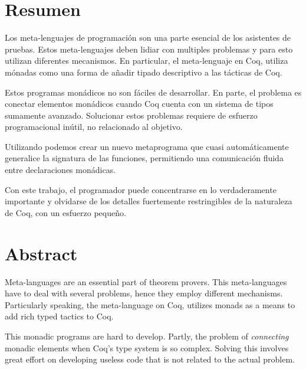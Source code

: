 \begingroup
\let\clearpage\relax
\let\cleardoublepage\relax
\let\cleardoublepage\relax



\chapter*{Resumen}

Los meta-lenguajes de programación son una parte esencial de los asistentes de pruebas. Estos meta-lenguajes deben lidiar con multiples problemas y para esto utilizan diferentes mecanismos. En particular, el meta-lenguaje \Mtac en Coq, utiliza mónadas como una forma de añadir tipado descriptivo a las tácticas de Coq.

Estos programas monádicos no son fáciles de desarrollar. En parte, el problema es conectar elementos monádicos cuando Coq cuenta con un sistema de tipos sumamente avanzado. Solucionar estos problemas requiere de esfuerzo programacional inútil, no relacionado al objetivo.

Utilizando \mtac podemos crear un nuevo metaprograma que cuasi automáticamente generalice la signatura de las funciones, permitiendo una comunicación fluida entre declaraciones monádicas. %

Con este trabajo, el programador puede concentrarse en lo verdaderamente importante y olvidarse de los detalles fuertemente restringibles de la naturaleza de Coq, con un esfuerzo pequeño.

\chapter*{Abstract}

Meta-languages are an essential part of theorem provers. This meta-languages have to deal with several problems, hence they employ different mechanisms.
Particularly speaking, the meta-language \Mtac on Coq, utilizes monads as a means to add rich typed tactics to Coq.

This monadic programs are hard to develop. Partly, the problem of \textit{connecting} monadic elements when Coq's type system is so complex. Solving this involves great effort on developing useless code that is not related to the actual problem.

